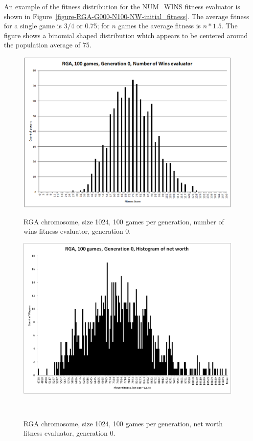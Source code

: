 An example of the fitness distribution for the NUM\_WINS fitness evaluator is
shown in Figure~\ref{figure-RGA-G000-N100-NW-initial_fitness}. The average
fitness for a single game is \(3/4\) or 0.75; for \(n\) games the average
fitness is \(n * 1.5\). The figure shows a binomial shaped distribution which
appears to be centered around the population average of 75.

\begin{figure}
\centering
\begin{minipage}[t]{0.47\linewidth}
\centering
\includegraphics[width=1.0\linewidth]{Figures/RGA_1024_G000_N100_NW.png}
\caption[RGA Num Wins Fitness Distribution, Initial Generation]{RGA chromosome,
size 1024, 100 games per generation, number of wins fitness evaluator,
generation 0.}
\label{figure-RGA-G000-N100-NW-initial_fitness}
\end{minipage}%
\hspace{0.06\linewidth}%
\begin{minipage}[t]{0.47\linewidth}
\centering
\includegraphics[width=1.0\linewidth]{Figures/RGA_1024_G000_N100_NetW.png}
\caption[Historgram of RGA Net Worth Fitness Distribution, Initial
Generation]{RGA chromosome, size 1024, 100 games per generation, net worth
fitness evaluator, generation 0.}
\label{figure-RGA-G000-N100-NetW-initial_fitness}
\end{minipage}
\\[\intextsep]


\end{figure}
